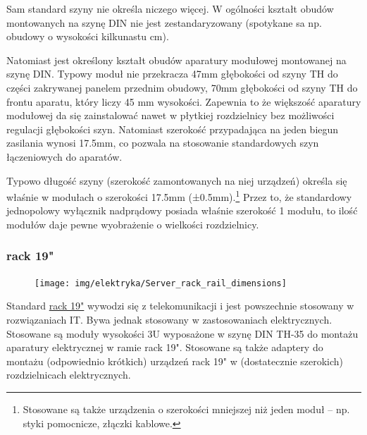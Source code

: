 Sam standard szyny nie określa niczego więcej.
W ogólności kształt obudów montowanych na szynę DIN nie jest zestandaryzowany (spotykane sa np. obudowy o wysokości kilkunastu cm).

Natomiast jest określony kształt obudów aparatury modułowej montowanej na szynę DIN.
Typowy moduł nie przekracza 47mm głębokości od szyny TH do części zakrywanej panelem przednim obudowy, 70mm głębokości od szyny TH do frontu aparatu, który liczy 45 mm wysokości.
Zapewnia to że większość aparatury modułowej da się zainstalować nawet w płytkiej rozdzielnicy bez możliwości regulacji głębokości szyn.
Natomiast szerokość przypadająca na jeden biegun zasilania wynosi 17.5mm, co pozwala na stosowanie standardowych szyn łączeniowych do aparatów.

Typowo długość szyny (szerokość zamontowanych na niej urządzeń) określa się właśnie w modułach o szerokości 17.5mm (±0.5mm).\footnote{Stosowane są także urządzenia o szerokości mniejszej niż jeden moduł – np. styki pomocnicze, złączki kablowe.}
Przez to, że standardowy jednopolowy wyłącznik nadprądowy posiada właśnie szerokość 1 modułu, to ilość modułów daje pewne wyobrażenie o wielkości rozdzielnicy.


\subsubsection{rack 19"}

\begin{figure}%
\vspace{-0.6cm}\texttt{[image: img/elektryka/Server\_rack\_rail\_dimensions]}\vspace{-1.6cm} %
\end{figure}

Standard \href{https://en.wikipedia.org/wiki/19-inch_rack}{rack 19"} wywodzi się z telekomunikacji i jest powszechnie stosowany w rozwiązaniach IT.
Bywa jednak stosowany w zastosowaniach elektrycznych.
Stosowane są moduły wysokości 3U wyposażone w szynę DIN TH-35 do montażu aparatury elektrycznej w ramie rack 19".
Stosowane są także adaptery do montażu (odpowiednio krótkich) urządzeń rack 19" w (dostatecznie szerokich) rozdzielnicach elektrycznych.


